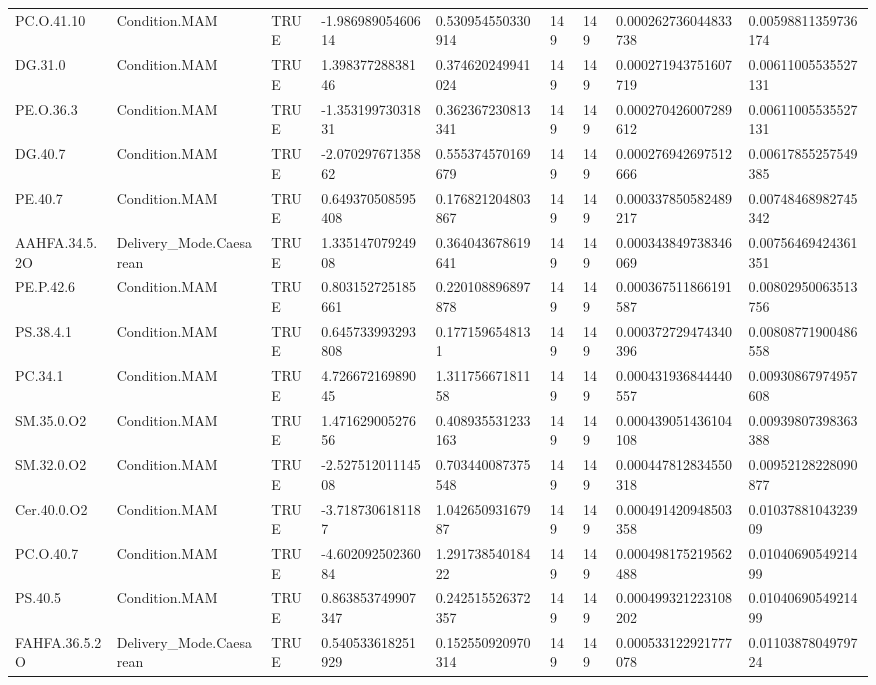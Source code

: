 \begin{longtable}{lllllllll}
PC.O.41.10 & Condition.MAM & TRUE & -1.98698905460614 & 0.530954550330914 & 149 & 149 & 0.000262736044833738 & 0.00598811359736174 \\
DG.31.0 & Condition.MAM & TRUE & 1.39837728838146 & 0.374620249941024 & 149 & 149 & 0.000271943751607719 & 0.00611005535527131 \\
PE.O.36.3 & Condition.MAM & TRUE & -1.35319973031831 & 0.362367230813341 & 149 & 149 & 0.000270426007289612 & 0.00611005535527131 \\
DG.40.7 & Condition.MAM & TRUE & -2.07029767135862 & 0.555374570169679 & 149 & 149 & 0.000276942697512666 & 0.00617855257549385 \\
PE.40.7 & Condition.MAM & TRUE & 0.649370508595408 & 0.176821204803867 & 149 & 149 & 0.000337850582489217 & 0.00748468982745342 \\
AAHFA.34.5.2O & Delivery\_Mode.Caesarean & TRUE & 1.33514707924908 & 0.364043678619641 & 149 & 149 & 0.000343849738346069 & 0.00756469424361351 \\
PE.P.42.6 & Condition.MAM & TRUE & 0.803152725185661 & 0.220108896897878 & 149 & 149 & 0.000367511866191587 & 0.00802950063513756 \\
PS.38.4.1 & Condition.MAM & TRUE & 0.645733993293808 & 0.1771596548131 & 149 & 149 & 0.000372729474340396 & 0.00808771900486558 \\
PC.34.1 & Condition.MAM & TRUE & 4.72667216989045 & 1.31175667181158 & 149 & 149 & 0.000431936844440557 & 0.00930867974957608 \\
SM.35.0.O2 & Condition.MAM & TRUE & 1.47162900527656 & 0.408935531233163 & 149 & 149 & 0.000439051436104108 & 0.00939807398363388 \\
SM.32.0.O2 & Condition.MAM & TRUE & -2.52751201114508 & 0.703440087375548 & 149 & 149 & 0.000447812834550318 & 0.00952128228090877 \\
Cer.40.0.O2 & Condition.MAM & TRUE & -3.7187306181187 & 1.04265093167987 & 149 & 149 & 0.000491420948503358 & 0.0103788104323909 \\
PC.O.40.7 & Condition.MAM & TRUE & -4.60209250236084 & 1.29173854018422 & 149 & 149 & 0.000498175219562488 & 0.0104069054921499 \\
PS.40.5 & Condition.MAM & TRUE & 0.863853749907347 & 0.242515526372357 & 149 & 149 & 0.000499321223108202 & 0.0104069054921499 \\
FAHFA.36.5.2O & Delivery\_Mode.Caesarean & TRUE & 0.540533618251929 & 0.152550920970314 & 149 & 149 & 0.000533122921777078 & 0.0110387804979724 \\

\end{longtable}
